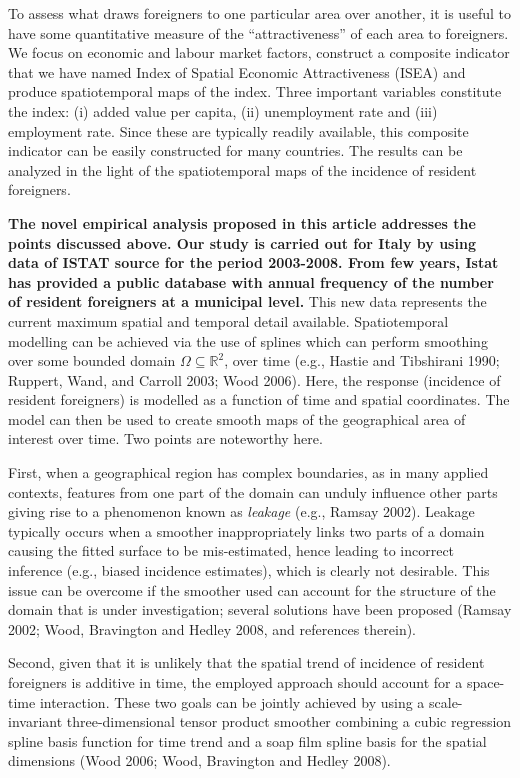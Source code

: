 \documentclass[10pt] {article}
\theoremstyle{definition}
\theoremstyle{plain}
\begin{document}
To assess what draws foreigners to one particular area over another, it is useful to have some quantitative measure of the ``attractiveness'' of each area to foreigners. We focus on economic and labour market factors, construct a composite indicator that we have named Index of Spatial Economic Attractiveness (ISEA) and produce spatiotemporal maps of the index. Three important variables constitute the index: (i) added value per capita, (ii) unemployment rate and (iii) employment rate. Since these are typically readily available, this composite indicator can be easily constructed for many countries. The results can be analyzed in the light of the spatiotemporal maps of the incidence of resident foreigners.

\textbf{The novel empirical analysis proposed in this article addresses the points discussed above. Our study is carried out for Italy by using data of ISTAT source for the period 2003-2008. From few years, Istat has provided a public database with annual frequency of the number of resident foreigners at a municipal level.} This new data represents the current maximum spatial and temporal detail available. Spatiotemporal modelling can be achieved via the use of splines which can perform smoothing over some bounded domain $\Omega\subseteq\mathbb{R}^2$, over time (e.g., Hastie and Tibshirani 1990; Ruppert, Wand, and Carroll 2003; Wood 2006). Here, the response (incidence of resident foreigners) is modelled as a function of time and spatial coordinates. The model can then be used to create smooth maps of the geographical area of interest over time. Two points are noteworthy here. 

First, when a geographical region has complex boundaries, as in many applied contexts, features from one part of the domain can unduly influence other parts giving rise to a phenomenon known as \textit{leakage} (e.g., Ramsay 2002). Leakage typically occurs when a smoother inappropriately links two parts of a domain causing the fitted surface to be mis-estimated, hence leading to incorrect inference (e.g., biased incidence estimates), which is clearly not desirable. This issue can be overcome if the smoother used can account for the structure of the domain that is under investigation; several solutions have been proposed (Ramsay 2002; Wood, Bravington and Hedley 2008, and references therein). 

Second, given that it is unlikely that the spatial trend of incidence of resident foreigners is additive in time, the employed approach should account for a space-time interaction. These two goals can be jointly achieved by using a scale-invariant three-dimensional tensor product smoother combining a cubic regression spline basis function for time trend and a soap film spline basis for the spatial dimensions (Wood 2006; Wood, Bravington and Hedley 2008).
\end{document}
